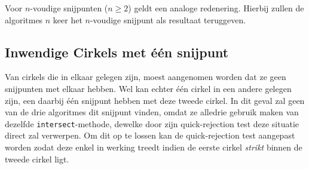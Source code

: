 \documentclass[12pt]{article}
\begin{document}
Voor $n$-voudige snijpunten ($n \geq 2$) geldt een analoge redenering. Hierbij zullen de algoritmes $n$ keer het $n$-voudige snijpunt als resultaat teruggeven.

\subsection{Inwendige Cirkels met één snijpunt}
Van cirkels die in elkaar gelegen zijn, moest aangenomen worden dat ze geen snijpunten met elkaar hebben. Wel kan echter één cirkel in een andere gelegen zijn, een daarbij één snijpunt hebben met deze tweede cirkel. In dit geval zal geen van de drie algoritmes dit snijpunt vinden, omdat ze alledrie gebruik maken van dezelfde \texttt{intersect}-methode, dewelke door zijn quick-rejection test deze situatie direct zal verwerpen. Om dit op te lossen kan de quick-rejection test aangepast worden zodat deze enkel in werking treedt indien de eerste cirkel \textit{strikt} binnen de tweede cirkel ligt.

\end{document}
